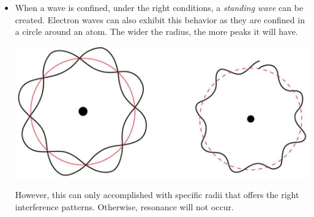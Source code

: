\documentclass{article}
\numberwithin{equation}{section}
\theoremstyle{classic}
\begin{document}
\begin{itemize}
    \item When a wave is confined, under the right conditions, a \textit{standing wave} can be created. Electron waves can also exhibit this behavior as they are confined in a circle around an atom. The wider the radius, the more peaks it will have.
    \begin{center}\includegraphics[width=0.5\linewidth]{Q1.PNG}\end{center}
    However, this can only accomplished with specific radii that offers the right interference patterns. Otherwise, resonance will not occur.

\end{itemize}
\end{document}
